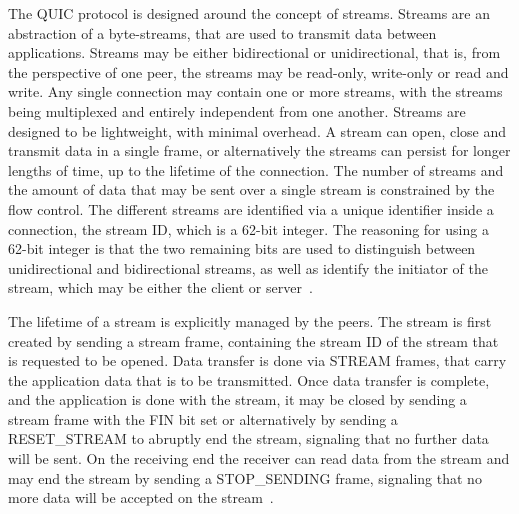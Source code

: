 \documentclass[english, 12pt, a4paper, elec, utf8, a-2b, online]{aaltothesis}
\begin{document}
The QUIC protocol is designed around the concept of streams. Streams are an abstraction
of a byte-streams, that are used to transmit data between applications. Streams may
be either bidirectional or unidirectional, that is, from the perspective of one peer,
the streams may be read-only, write-only or read and write. Any single connection may contain one or
more streams, with the streams being multiplexed and entirely independent from one
another. Streams are designed to be lightweight, with minimal overhead. A stream can
open, close and transmit data in a single frame, or alternatively the streams
can persist for longer lengths of time, up to the lifetime of the connection. The number
of streams and the amount of data that may be sent over a single stream is constrained
by the flow control. The different streams are identified via a unique identifier inside a connection,
the stream ID, which is a 62-bit integer. The reasoning for using a 62-bit integer is
that the two remaining bits are used to distinguish between unidirectional and bidirectional
streams, as well as identify the initiator of the stream, which may be either the
client or server~\cite{rfc9000}.

The lifetime of a stream is explicitly managed by the peers. The stream is first
created by sending a stream frame, containing the stream ID of the stream that is
requested to be opened. Data transfer is done via STREAM frames, that carry the
application data that is to be transmitted. Once data transfer is complete, and
the application is done with the stream, it may be closed by sending a stream
frame with the FIN bit set or alternatively by sending a RESET\_STREAM to abruptly end the
stream, signaling that no further data will be sent. On the receiving end the receiver
can read data from the stream and may end the stream by sending a STOP\_SENDING frame,
signaling that no more data will be accepted on the stream~\cite{rfc9000}.
\end{document}
